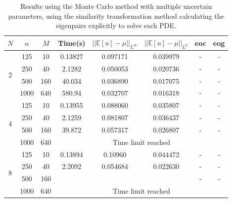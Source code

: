 \documentclass[11pt]{article}
\numberwithin{equation}{section}
\begin{document}
\begin{table}[H]
\centering
\begin{tabular}{|c|c|c|c|c|c|c|c|}
\hline
$N$ & $n$ & $M$ & Time(s) & $|| \mathbb{E}[u] - \mu ||_{L^{\infty}}$ & $|| \mathbb{E}[u] - \mu ||_{L^{2}}$ & eoc & eog \\
\hline
\multirow{4}{*}{2} & 125 & 10 & 0.13827 & 0.097171 & 0.039979 & - & - \\
& 250 & 40 & 2.1282 & 0.050053 & 0.020736 & - & - \\
& 500 & 160 & 40.034 & 0.036890 & 0.017075 & - & - \\
& 1000 & 640 & 580.94 & 0.032707 & 0.016318 & - & - \\
\hline
\multirow{4}{*}{4} & 125 & 10 & 0.13955 & 0.088060 & 0.035807 & - & - \\
& 250 & 40 & 2.1259 & 0.081807 & 0.036437 & - & - \\
& 500 & 160 & 39.872 & 0.057317 & 0.026807 & - & - \\
\cline{4-8}
& 1000 & 640 & \multicolumn{5}{c|}{Time limit reached} \\
\hline
\multirow{4}{*}{8} & 125 & 10 & 0.13894 & 0.10960 & 0.044472 & - & - \\
& 250 & 40 & 2.2092 & 0.054684 & 0.022630 & - & - \\
& 500 & 160 & & & & - & - \\
\cline{4-8}
& 1000 & 640 & \multicolumn{5}{c|}{Time limit reached} \\
\hline
\end{tabular}
\captionsetup{justification=centering}
\caption{Results using the Monte Carlo method with multiple uncertain parameters, using the similarity transformation method calculating the eigenpairs explicitly to solve each PDE.}
\label{table:monte carlo multiple}
\end{table}
\end{document}
